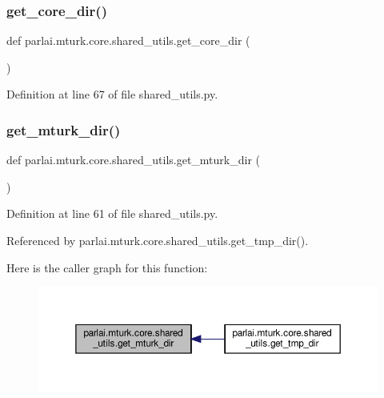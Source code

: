 \subsubsection{\texorpdfstring{get\+\_\+core\+\_\+dir()}{get\_core\_dir()}}
{\footnotesize\ttfamily def parlai.\+mturk.\+core.\+shared\+\_\+utils.\+get\+\_\+core\+\_\+dir (\begin{DoxyParamCaption}{ }\end{DoxyParamCaption})}



Definition at line 67 of file shared\+\_\+utils.\+py.

\mbox{\label{namespaceparlai_1_1mturk_1_1core_1_1shared__utils_aabd480fc6090e1fa769ff3926f7e842d}} 
\subsubsection{\texorpdfstring{get\+\_\+mturk\+\_\+dir()}{get\_mturk\_dir()}}
{\footnotesize\ttfamily def parlai.\+mturk.\+core.\+shared\+\_\+utils.\+get\+\_\+mturk\+\_\+dir (\begin{DoxyParamCaption}{ }\end{DoxyParamCaption})}



Definition at line 61 of file shared\+\_\+utils.\+py.



Referenced by parlai.\+mturk.\+core.\+shared\+\_\+utils.\+get\+\_\+tmp\+\_\+dir().

Here is the caller graph for this function\+:
\nopagebreak
\begin{figure}[H]
\begin{center}
\leavevmode
\includegraphics[width=350pt]{namespaceparlai_1_1mturk_1_1core_1_1shared__utils_aabd480fc6090e1fa769ff3926f7e842d_icgraph}
\end{center}
\end{figure}
\mbox{\label{namespaceparlai_1_1mturk_1_1core_1_1shared__utils_aa0c7ddb9db866e2f19ec6a83112fc9d2}} 
